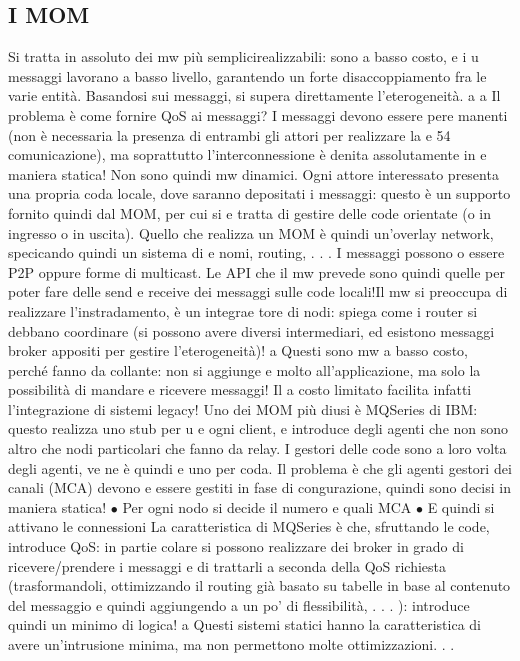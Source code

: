 \documentclass[a4paper,12pt]{article}
\begin{document}
\subsection{I MOM}
Si tratta in assoluto dei mw più semplicirealizzabili: sono a basso costo, e i
u
messaggi lavorano a basso livello, garantendo un forte disaccoppiamento fra le
varie entità. Basandosi sui messaggi, si supera direttamente l'eterogeneità.
a
a
Il problema è come fornire QoS ai messaggi? I messaggi devono essere pere
manenti (non è necessaria la presenza di entrambi gli attori per realizzare la
e
54
comunicazione), ma soprattutto l'interconnessione è denita assolutamente in
e
maniera statica! Non sono quindi mw dinamici.
Ogni attore interessato presenta una propria coda locale, dove saranno depositati i messaggi: questo è un supporto
fornito quindi dal MOM, per cui si
e
tratta di gestire delle code orientate (o in ingresso o in uscita). Quello che realizza un MOM è quindi un'overlay
network, specicando quindi un sistema di
e
nomi, routing, . . .
I messaggi possono o essere P2P oppure forme di multicast. Le API che il
mw prevede sono quindi quelle per poter fare delle send e receive dei messaggi
sulle code locali!Il mw si preoccupa di realizzare l'instradamento, è un integrae
tore di nodi: spiega come i router si debbano coordinare (si possono avere diversi
intermediari, ed esistono messaggi broker appositi per gestire l'eterogeneità)!
a
Questi sono mw a basso costo, perché fanno da collante: non si aggiunge
e
molto all'applicazione, ma solo la possibilità di mandare e ricevere messaggi! Il
a
costo limitato facilita infatti l'integrazione di sistemi legacy!
Uno dei MOM più diusi è MQSeries di IBM: questo realizza uno stub per
u
e
ogni client, e introduce degli agenti che non sono altro che nodi particolari che
fanno da relay. I gestori delle code sono a loro volta degli agenti, ve ne è quindi
e
uno per coda. Il problema è che gli agenti gestori dei canali (MCA) devono
e
essere gestiti in fase di congurazione, quindi sono decisi in maniera statica!
$\bullet$ Per ogni nodo si decide il numero e quali MCA
$\bullet$ E quindi si attivano le connessioni
La caratteristica di MQSeries è che, sfruttando le code, introduce QoS: in partie
colare si possono realizzare dei broker in grado di ricevere/prendere i messaggi e
di trattarli a seconda della QoS richiesta (trasformandoli, ottimizzando il routing già basato su tabelle in base al
contenuto del messaggio e quindi aggiungendo
a
un po' di flessibilità, . . . ): introduce quindi un minimo di logica!
a
Questi sistemi statici hanno la caratteristica di avere un'intrusione minima,
ma non permettono molte ottimizzazioni. . .
\end{document}
